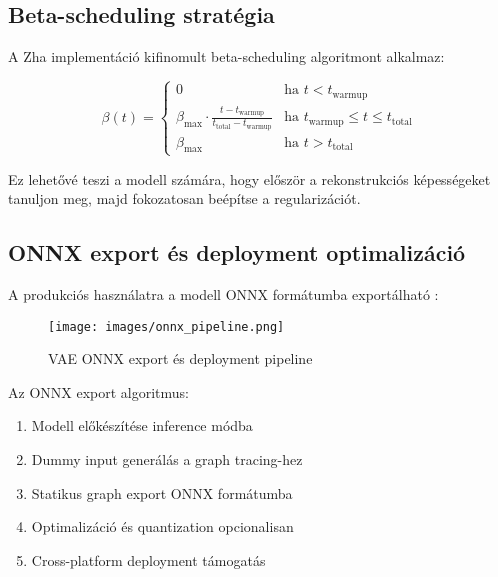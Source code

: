 \subsection{Beta-scheduling stratégia}
A Zha implementáció kifinomult beta-scheduling algoritmont alkalmaz:

\[
\beta(t) = \begin{cases}
0 & \text{ha } t < t_{\text{warmup}} \\
\beta_{\text{max}} \cdot \frac{t - t_{\text{warmup}}}{t_{\text{total}} - t_{\text{warmup}}} & \text{ha } t_{\text{warmup}} \leq t \leq t_{\text{total}} \\
\beta_{\text{max}} & \text{ha } t > t_{\text{total}}
\end{cases}
\]

Ez lehetővé teszi a modell számára, hogy először a rekonstrukciós képességeket tanuljon meg, majd fokozatosan beépítse a regularizációt.

\subsection{ONNX export és deployment optimalizáció}
A produkciós használatra a modell ONNX formátumba exportálható \cite{torch2023}:

\begin{figure}[h]
\centering
\texttt{[image: images/onnx\_pipeline.png]}
\caption{VAE ONNX export és deployment pipeline}
\label{fig:onnx}
\end{figure}

Az ONNX export algoritmus:
\begin{enumerate}
\item Modell előkészítése inference módba
\item Dummy input generálás a graph tracing-hez
\item Statikus graph export ONNX formátumba
\item Optimalizáció és quantization opcionalisan
\item Cross-platform deployment támogatás
\end{enumerate}